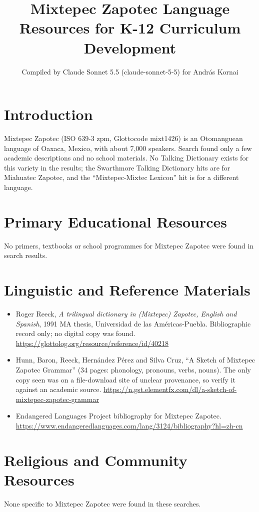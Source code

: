 \documentclass[12pt]{article}
\title{Mixtepec Zapotec Language Resources for K-12 Curriculum Development}
\author{Compiled by Claude Sonnet 5.5 (claude-sonnet-5-5) for Andr\'as Kornai}
\date{}
\begin{document}
\maketitle

\section{Introduction}
Mixtepec Zapotec (ISO 639-3 zpm, Glottocode mixt1426) is an Otomanguean language of Oaxaca, Mexico, with about 7,000 speakers. Search found only a few academic descriptions and no school materials. No Talking Dictionary exists for this variety in the results; the Swarthmore Talking Dictionary hits are for Miahuatec Zapotec, and the ``Mixtepec-Mixtec Lexicon'' hit is for a different language.

\section{Primary Educational Resources}
No primers, textbooks or school programmes for Mixtepec Zapotec were found in search results.

\section{Linguistic and Reference Materials}
\begin{itemize}
\item Roger Reeck, \emph{A trilingual dictionary in (Mixtepec) Zapotec, English and Spanish}, 1991 MA thesis, Universidad de las Am\'ericas-Puebla. Bibliographic record only; no digital copy was found. \url{https://glottolog.org/resource/reference/id/40218}
\item Hunn, Baron, Reeck, Hern\'andez P\'erez and Silva Cruz, ``A Sketch of Mixtepec Zapotec Grammar'' (34 pages: phonology, pronouns, verbs, nouns). The only copy seen was on a file-download site of unclear provenance, so verify it against an academic source. \url{https://n.gst.elementfx.com/dl/a-sketch-of-mixtepec-zapotec-grammar}
\item Endangered Languages Project bibliography for Mixtepec Zapotec. \url{https://www.endangeredlanguages.com/lang/3124/bibliography?hl=zh-cn}
\end{itemize}

\section{Religious and Community Resources}
None specific to Mixtepec Zapotec were found in these searches.
\end{document}
